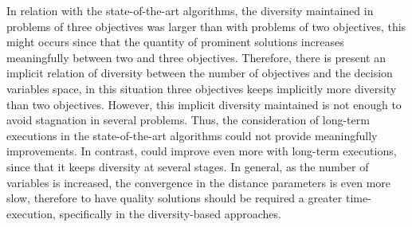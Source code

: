 In relation with the state-of-the-art algorithms, the diversity maintained in problems of three objectives was larger than with problems of two objectives, this might occurs since that the quantity of prominent solutions increases meaningfully between two and three objectives.
%
Therefore, there is present an implicit relation of diversity between the number of objectives and the decision variables space, in this situation three objectives keeps implicitly more diversity than two objectives.
%
However, this implicit diversity maintained is not enough to avoid stagnation in several problems.
%
Thus, the consideration of long-term executions in the state-of-the-art algorithms could not provide meaningfully improvements.
%
In contrast, \VSDMOEA{} could improve even more with long-term executions, since that it keeps diversity at several stages.
%
In general, as the number of variables is increased, the convergence in the distance parameters is even more slow, therefore to have quality solutions should be required a greater time-execution, specifically in the diversity-based approaches.
%

